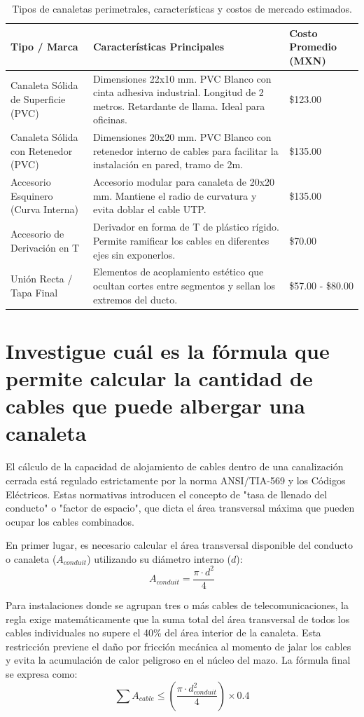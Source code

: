 \documentclass[a4paper,12pt]{article}
\begin{document}
\begin{table}[H]
\centering
\begin{tabular}{|p{3.5cm}|p{7.5cm}|p{3cm}|}
\hline
\textbf{Tipo / Marca} & \textbf{Características Principales} & \textbf{Costo Promedio (MXN)} \\ \hline
Canaleta Sólida de Superficie (PVC) & Dimensiones 22x10 mm. PVC Blanco con cinta adhesiva industrial. Longitud de 2 metros. Retardante de llama. Ideal para oficinas. & \$123.00 \\ \hline
Canaleta Sólida con Retenedor (PVC) & Dimensiones 20x20 mm. PVC Blanco con retenedor interno de cables para facilitar la instalación en pared, tramo de 2m. & \$135.00 \\ \hline
Accesorio Esquinero (Curva Interna) & Accesorio modular para canaleta de 20x20 mm. Mantiene el radio de curvatura y evita doblar el cable UTP. & \$135.00 \\ \hline
Accesorio de Derivación en T & Derivador en forma de T de plástico rígido. Permite ramificar los cables en diferentes ejes sin exponerlos. & \$70.00 \\ \hline
Unión Recta / Tapa Final & Elementos de acoplamiento estético que ocultan cortes entre segmentos y sellan los extremos del ducto. & \$57.00 - \$80.00 \\ \hline
\end{tabular}
\caption{Tipos de canaletas perimetrales, características y costos de mercado estimados.}
\end{table}

\newpage

\section{Investigue cuál es la fórmula que permite calcular la cantidad de cables que puede albergar una canaleta}

El cálculo de la capacidad de alojamiento de cables dentro de una canalización cerrada está regulado estrictamente por la norma ANSI/TIA-569 y los Códigos Eléctricos. Estas normativas introducen el concepto de "tasa de llenado del conducto" o "factor de espacio", que dicta el área transversal máxima que pueden ocupar los cables combinados.

En primer lugar, es necesario calcular el área transversal disponible del conducto o canaleta ($A_{conduit}$) utilizando su diámetro interno ($d$):
$$A_{conduit} = \frac{\pi \cdot d^2}{4}$$

Para instalaciones donde se agrupan tres o más cables de telecomunicaciones, la regla exige matemáticamente que la suma total del área transversal de todos los cables individuales no supere el 40\% del área interior de la canaleta. Esta restricción previene el daño por fricción mecánica al momento de jalar los cables y evita la acumulación de calor peligroso en el núcleo del mazo. La fórmula final se expresa como:
$$\sum A_{cable} \le \left( \frac{\pi \cdot d_{conduit}^2}{4} \right) \times 0.4$$
\end{document}
